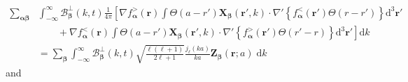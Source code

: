 \documentclass{article}
\begin{document}
\begin{equation}
\begin{split}
\sum_{\bm{\alpha}\bm{\beta}}&\int_{-\infty}^\infty \mathcal{B}_{\bm{\beta}}^\perp(k,t)\frac{1}{4\pi}\left[\nabla f_{\bm{\alpha}}^>(\mathbf{r})\int\Theta(a - r')\mathbf{X}_{\bm{\beta}}(\mathbf{r}',k)\cdot\nabla'\left\{f_{\bm{\alpha}}^<(\mathbf{r}')\Theta(r - r')\right\}\mathrm{d}^3\mathbf{r}'\right.\\
&\left.\qquad+ \nabla f_{\bm{\alpha}}^<(\mathbf{r})\int\Theta(a - r')\mathbf{X}_{\bm{\beta}}(\mathbf{r}',k)\cdot\nabla'\left\{f_{\bm{\alpha}}^>(\mathbf{r}')\Theta(r' - r)\right\}\mathrm{d}^3\mathbf{r}'\right]\mathrm{d}k\\
&= \sum_{\bm{\beta}}\int_{-\infty}^\infty \mathcal{B}_{\bm{\beta}}^\perp(k,t)\sqrt{\frac{\ell(\ell + 1)}{2\ell + 1}}\frac{j_\ell(ka)}{ka}\mathbf{Z}_{\bm{\beta}}(\mathbf{r};a)\;\mathrm{d}k
\end{split}
\end{equation}
and
\end{document}
